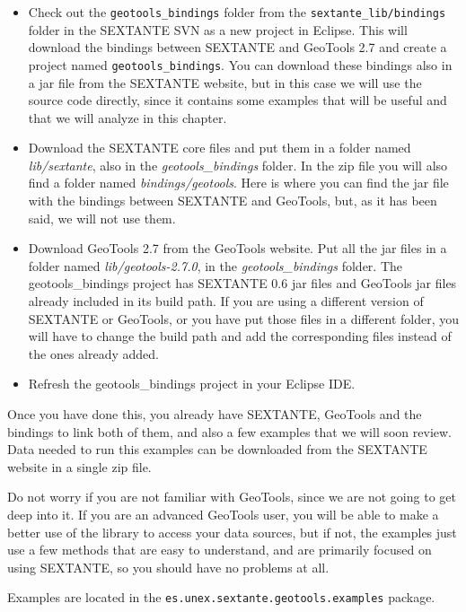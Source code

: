 \begin{itemize}
 \item Check out the \texttt{geotools\_bindings} folder from the \texttt{sextante\_lib/bindings} folder in the SEXTANTE SVN as a new project in Eclipse. This will download the bindings between SEXTANTE and GeoTools 2.7 and create a project named \texttt{geotools\_bindings}. You can download these bindings also in a jar file from the SEXTANTE website, but in this case we will use the source code directly, since it contains some examples that will be useful and that we will analyze in this chapter.
 \item Download the SEXTANTE core files and put them in a folder named \emph{lib/sextante}, also in the \emph{geotools\_bindings} folder. In the zip file you will also find a folder named \emph{bindings/geotools}. Here is where you can find the jar file with the bindings between SEXTANTE and GeoTools, but, as it has been said, we will not use them.
\item Download GeoTools 2.7 from the GeoTools website. Put all the jar files in a folder named \emph{lib/geotools-2.7.0}, in the \emph{geotools\_bindings} folder. The geotools\_bindings project has SEXTANTE 0.6 jar files and GeoTools jar files already included in its build path. If you are using a different version of SEXTANTE or GeoTools, or you have put those files in a different folder, you will have to change the build path and add the corresponding files instead of the ones already added.

\item Refresh the geotools\_bindings project in your Eclipse IDE.
\end{itemize}

Once you have done this, you already have SEXTANTE, GeoTools and the bindings to link both of them, and also a few examples that we will soon review. Data needed to run this examples can be downloaded from the SEXTANTE website in a single zip file. 

Do not worry if you are not familiar with GeoTools, since we are not going to get deep into it. If you are an advanced GeoTools user, you will be able to make a better use of the library to access your data sources, but if not, the examples just use a few methods that are easy to understand, and are primarily focused on using SEXTANTE, so you should have no problems at all.

Examples are located in the \texttt{es.unex.sextante.geotools.examples} package.

